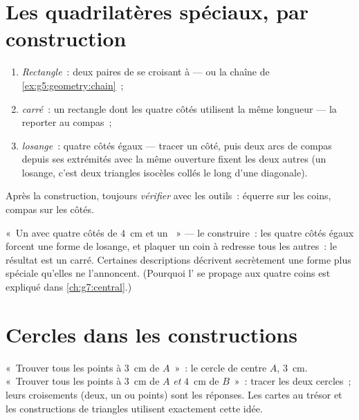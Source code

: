 \section{Les quadrilatères spéciaux, par construction}

\begin{method}\label{met:g5:geometry:quadrilaterals}
\begin{enumerate}
  \item \emph{Rectangle}~: deux paires de  se croisant à
         --- ou la chaîne de \cref{ex:g5:geometry:chain}~;
  \item \emph{carré}~: un rectangle dont les quatre côtés utilisent
        la même longueur --- la reporter au compas~;
  \item \emph{losange}~: quatre côtés égaux --- tracer un côté,
        puis deux arcs de compas depuis ses extrémités avec la même
        ouverture fixent les deux autres  (un losange, c'est
        deux triangles isocèles collés le long d'une diagonale).
\end{enumerate}
Après la construction, toujours \emph{vérifier} avec les outils~:
équerre sur les coins, compas sur les côtés.
\end{method}

\begin{example}\label{ex:g5:geometry:recognize}
«~Un  avec quatre côtés de $4$~cm et un ~»
--- le construire~: les quatre côtés égaux forcent une forme de
losange, et plaquer un coin à  redresse tous les
autres~: le résultat est un carré. Certaines descriptions
décrivent secrètement une forme plus spéciale qu'elles ne
l'annoncent. (Pourquoi l' se propage aux quatre coins
est expliqué dans \cref{ch:g7:central}.)
\end{example}

\section{Cercles dans les constructions}

\begin{example}\label{ex:g5:geometry:circle}
«~Trouver tous les points à $3$~cm de $A$~»~: le cercle de centre
$A$,  $3$~cm. «~Trouver tous les points à $3$~cm de $A$
\emph{et} $4$~cm de $B$~»~: tracer les deux cercles~; leurs
croisements (deux, un ou  points) sont les réponses. Les cartes
au trésor et les constructions de triangles utilisent exactement
cette idée.
\end{example}

